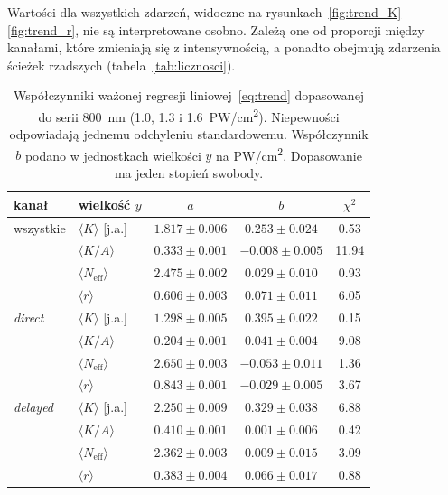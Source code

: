 \documentclass[12pt,a4paper]{article}
\newcommand{\Neff}{N_{\mathrm{eff}}}
\newcommand{\ja}{j.a.}
\newcommand{\PWcm}{PW/cm\textsuperscript{2}}
\begin{document}
Wartości dla wszystkich zdarzeń, widoczne na
rysunkach~\ref{fig:trend_K}--\ref{fig:trend_r}, nie są interpretowane
osobno. Zależą one od proporcji między kanałami, które zmieniają się
z intensywnością, a ponadto obejmują zdarzenia ścieżek rzadszych
(tabela~\ref{tab:licznosci}).
\begin{table}[htbp]
  \centering
  \caption{Współczynniki ważonej regresji liniowej~\eqref{eq:trend}
  dopasowanej do serii \num{800}~nm (\num{1.0}, \num{1.3}
  i \num{1.6}~\PWcm). Niepewności odpowiadają jednemu odchyleniu
  standardowemu. Współczynnik $b$ podano w jednostkach wielkości $y$ na
  \PWcm. Dopasowanie ma jeden stopień swobody.}
  \label{tab:trend_fit}
  \begin{tabular}{llccc}
    \toprule
    kanał & wielkość $y$ & $a$ & $b$ & $\chi^2$ \\
    \midrule
    wszystkie      & $\langle K\rangle$ [\ja] & $\num{1.817}\pm\num{0.006}$ & $\num{0.253}\pm\num{0.024}$  & \num{0.53} \\
                   & $\langle K/A\rangle$     & $\num{0.333}\pm\num{0.001}$ & $\num{-0.008}\pm\num{0.005}$ & \num{11.94} \\
                   & $\langle\Neff\rangle$    & $\num{2.475}\pm\num{0.002}$ & $\num{0.029}\pm\num{0.010}$  & \num{0.93} \\
                   & $\langle r\rangle$       & $\num{0.606}\pm\num{0.003}$ & $\num{0.071}\pm\num{0.011}$ & \num{6.05} \\
    \midrule
    \emph{direct}  & $\langle K\rangle$ [\ja] & $\num{1.298}\pm\num{0.005}$ & $\num{0.395}\pm\num{0.022}$  & \num{0.15} \\
                   & $\langle K/A\rangle$     & $\num{0.204}\pm\num{0.001}$ & $\num{0.041}\pm\num{0.004}$  & \num{9.08} \\
                   & $\langle\Neff\rangle$    & $\num{2.650}\pm\num{0.003}$ & $\num{-0.053}\pm\num{0.011}$ & \num{1.36} \\
                   & $\langle r\rangle$       & $\num{0.843}\pm\num{0.001}$ & $\num{-0.029}\pm\num{0.005}$ & \num{3.67} \\
    \midrule
    \emph{delayed} & $\langle K\rangle$ [\ja] & $\num{2.250}\pm\num{0.009}$ & $\num{0.329}\pm\num{0.038}$  & \num{6.88} \\
                   & $\langle K/A\rangle$     & $\num{0.410}\pm\num{0.001}$ & $\num{0.001}\pm\num{0.006}$  & \num{0.42} \\
                   & $\langle\Neff\rangle$    & $\num{2.362}\pm\num{0.003}$ & $\num{0.009}\pm\num{0.015}$  & \num{3.09} \\
                   & $\langle r\rangle$       & $\num{0.383}\pm\num{0.004}$ & $\num{0.066}\pm\num{0.017}$ & \num{0.88} \\
    \bottomrule
  \end{tabular}
\end{table}
\end{document}
